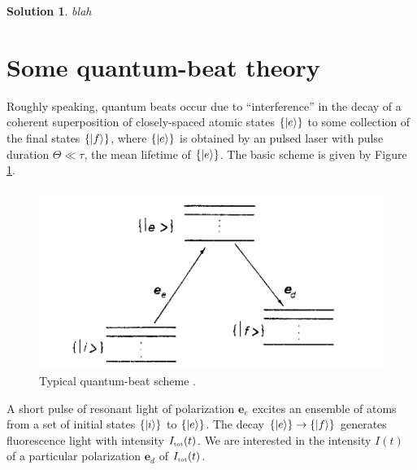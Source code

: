 \documentclass[11pt]{article}
\newtheorem{solution}{Solution}
\begin{document}
\begin{solution}
	blah
\end{solution}






\section{Some quantum-beat theory}\label{sec:beat_theory}

Roughly speaking, quantum beats occur due to ``interference'' in the decay of a coherent superposition of closely-spaced atomic states $\{\ket{{e}}\}$ to some collection of the final states $\{ \ket{{f}}  \}$, where $\{ \ket{{e}}   \}$ is obtained by an pulsed laser with pulse duration $\Theta \ll \tau$, the mean lifetime of $\{ \ket{{e}}   \}$. The basic scheme is given by Figure \ref{fig:energies}.

\begin{figure}[!htb]
	\centering
	\includegraphics[scale=0.7]{energies}
	\caption{Typical quantum-beat scheme \cite{Luypaert_1977}.}
	\label{fig:energies}
\end{figure}


A short pulse of resonant light of polarization $\mathbf{e}_e$ excites an ensemble of atoms from a set of initial states $\{ \ket{i}  \}$ to $\{ \ket{e} \}$. The decay $\{ \ket{e} \} \to\{ \ket{f}  \}$ generates fluorescence light with intensity $I_{\tiny{\mbox{tot}}}(t)$. We are interested in the intensity $I(t)$ of a particular polarization $\mathbf{e}_d$ of $I_{\tiny{\mbox{tot}}}(t)$.  
\end{document}
